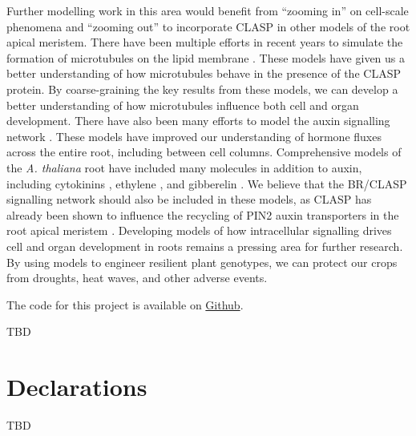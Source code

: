 \documentclass[referee,pdflatex,sn-mathphys-num]{sn-jnl}
\begin{document}
Further modelling work in this area would benefit from ``zooming in'' on cell-scale phenomena and ``zooming out'' to incorporate CLASP in other models of the root apical meristem.
There have been multiple efforts in recent years to simulate the formation of microtubules on the lipid membrane \cite{tian2023, tindemans2014, allard2010a}.
These models have given us a better understanding of how microtubules behave in the presence of the CLASP protein.
By coarse-graining the key results from these models, we can develop a better understanding of how microtubules influence both cell and organ development.
There have also been many efforts to model the auxin signalling network \cite{grieneisen2007, dimambro2017}.
These models have improved our understanding of hormone fluxes across the entire root, including between cell columns.
Comprehensive models of the \emph{A. thaliana} root have included many molecules in addition to auxin, including cytokinins \cite{salvi2020}, ethylene \cite{moore2024}, and gibberelin \cite{muraro2016}.
We believe that the BR/CLASP signalling network should also be included in these models, as CLASP has already been shown to influence the recycling of PIN2 auxin transporters in the root apical meristem \cite{ambrose2013}.
Developing models of how intracellular signalling drives cell and organ development in roots remains a pressing area for further research.
By using models to engineer resilient plant genotypes, we can protect our crops from droughts, heat waves, and other adverse events.

\backmatter


The code for this project is available on \href{https://github.com/rileywheadon/clasp-model}{Github}.


TBD

\section*{Declarations}

TBD


\end{document}
